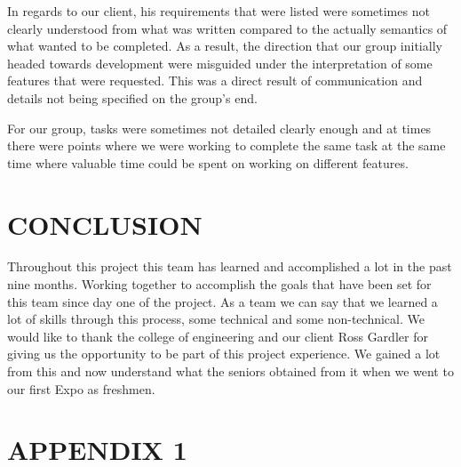 \documentclass[draftclsnofoot,10pt,onecolumn]{IEEEtran} %
\begin{document}
In regards to our client, his requirements that were listed were sometimes not
clearly understood from what was written compared to the actually semantics of
what wanted to be completed. As a result, the direction that our group initially
headed towards development were misguided under the interpretation of some
features that were requested. This was a direct result of communication and
details not being specified on the group's end.

For our group, tasks were sometimes not detailed clearly enough and at times
there were points where we were working to complete the same task at the same
time where valuable time could be spent on working on different features.

\section{CONCLUSION}

Throughout this project this team has learned and accomplished a lot in the 
past nine months. Working together to accomplish the goals that have been set
for this team since day one of the project. As a team we can say that we learned
a lot of skills through this process, some technical and some non-technical. We
would like to thank the college of engineering and our client Ross Gardler for
giving us the opportunity to be part of this project experience. We gained a lot
from this and now understand what the seniors obtained from it when we went to
our first Expo as freshmen. 

\section{APPENDIX 1}
\end{document}
